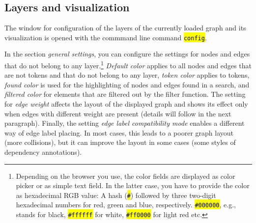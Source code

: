 \documentclass[12pt]{scrartcl}
\newcommand{\code}[1]{\hl{\texttt{#1}}}
\begin{document}
\subsection{Layers and visualization}\label{ebenenkonfiguration}

The window for configuration of the layers of the currently loaded graph and its visualization is opened with the commmand line command \code{config}.

In the section \textit{general settings}, you can configure the settings for nodes and edges that do not belong to any layer.\footnote{Depending on the browser you use, the color fields are displayed as color picker or as simple text field. In the latter case, you have to provide the color as hexadecimal RGB value: A hash (\code{\#}) followed by three two-digit hexadecimal numbers for red, green and blue, respectively. \code{\#000000}, e.g., stands for black, \code{\#ffffff} for white, \code{\#ff0000} for light red etc.}
\textit{Default color} applies to all nodes and edges that are not tokens and that do not belong to any layer, \textit{token color} applies to tokens, \textit{found color} is used for the highlighting of nodes and edges found in a search, and \textit{filtered color} for elements that are filtered out by the filter function.
The setting for \textit{edge weight} affects the layout of the displayed graph and shows its effect only when edges with different weight are present (details will follow in the next paragraph).
Finally, the setting \textit{edge label compatibility mode} enables a different way of edge label placing.
In most cases, this leads to a poorer graph layout (more collisions), but it can improve the layout in some cases (some styles of dependency annotations).
\end{document}

